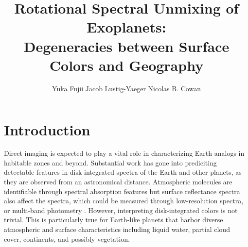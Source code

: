 \documentclass[iop,numberedappendix,apj,]{emulateapj}
\begin{document}
\title{Rotational Spectral Unmixing of Exoplanets:\\Degeneracies between Surface Colors and Geography}


\author{
%
Yuka Fujii 
%
Jacob Lustig-Yaeger 
%
Nicolas B. Cowan 
%
}

      
  







\vspace{0.5\baselineskip}


\begin{abstract}

\end{abstract}

  



\section{Introduction}
\label{sec:intro}

Direct imaging is expected to play a vital role in characterizing Earth analogs in habitable zones and beyond. 
Substantial work has gone into prediciting detectable features in disk-integrated spectra of the Earth and other planets, as they are observed from an astronomical distance. 
Atmospheric molecules are identifiable through spectral absorption features \citep[e.g.,][]{DesMarais2002} but surface reflectance spectra also affect the spectra, which could be measured through low-resolution spectra, or multi-band photometry \citep[e.g.,][]{Ford2001}. 
However, interpreting disk-integrated colors is not trivial. 
This is particularly true for Earth-like planets that harbor diverse atmospheric and surface characteristics including liquid water, partial cloud cover, continents, and possibly vegetation. 
\end{document}
